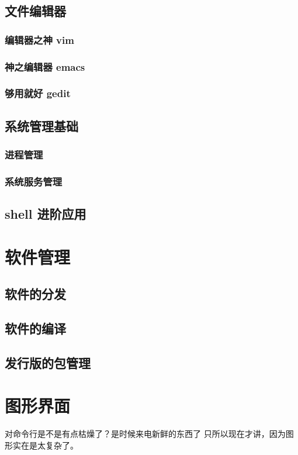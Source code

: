 \documentclass[amstex,twoside]{ctexbook}
\begin{document}
\section{文件编辑器}
\subsection{编辑器之神 vim	}
\subsection{神之编辑器 emacs	}
\subsection{够用就好 gedit	}
\section{系统管理基础}

\subsection{进程管理	}
\subsection{系统服务管理	}

\section{ shell 进阶应用}

\chapter{软件管理}
\section{ 软件的分发	}
\section{软件的编译	}
\section{发行版的包管理}\label{section:pkgmgr}
	
\chapter{图形界面}
对命令行是不是有点枯燥了？是时候来电新鲜的东西了 只所以现在才讲，因为图形实在是太复杂了。
\end{document}

